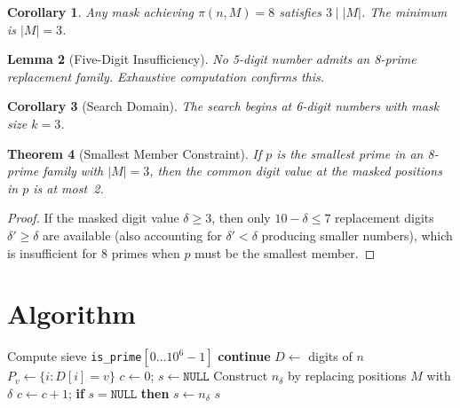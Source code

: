 \documentclass[12pt]{article}
\newtheorem{theorem}{Theorem}
\newtheorem{lemma}[theorem]{Lemma}
\newtheorem{corollary}[theorem]{Corollary}
\theoremstyle{definition}
\begin{document}
\begin{corollary}
Any mask achieving $\pi(n, M) = 8$ satisfies $3 \mid |M|$. The minimum is $|M| = 3$.
\end{corollary}

\begin{lemma}[Five-Digit Insufficiency]
No 5-digit number admits an 8-prime replacement family. Exhaustive computation confirms this.
\end{lemma}

\begin{corollary}[Search Domain]
The search begins at 6-digit numbers with mask size $k = 3$.
\end{corollary}

\begin{theorem}[Smallest Member Constraint]
If $p$ is the smallest prime in an 8-prime family with $|M| = 3$, then the common digit value at the masked positions in $p$ is at most~2.
\end{theorem}

\begin{proof}
If the masked digit value $\delta \geq 3$, then only $10 - \delta \leq 7$ replacement digits $\delta' \geq \delta$ are available (also accounting for $\delta' < \delta$ producing smaller numbers), which is insufficient for 8 primes when $p$ must be the smallest member.
\end{proof}

\section{Algorithm}

\begin{algorithmic}[1]
    \State Compute sieve \texttt{is\_prime}$[0 \ldots 10^6 - 1]$
         \textbf{continue} \EndIf
        \State $D \gets$ digits of $n$
            \State $P_v \gets \{i : D[i] = v\}$
                \State $c \gets 0$; $s \gets \texttt{NULL}$
                    \State Construct $n_\delta$ by replacing positions $M$ with $\delta$
                        \State $c \gets c + 1$; \textbf{if} $s = \texttt{NULL}$ \textbf{then} $s \gets n_\delta$
                    \EndIf
                \EndFor
                 \Return $s$ \EndIf
            \EndFor
        \EndFor
    \EndFor
\EndProcedure
\end{algorithmic}
\end{document}

